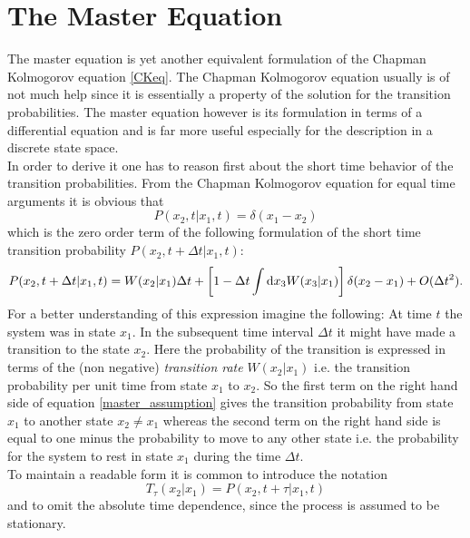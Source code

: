 \section{The Master Equation}
\label{The_Master_Equation}
The master equation is yet another equivalent formulation of the Chapman Kolmogorov equation \eqref{CKeq}. The Chapman Kolmogorov equation usually is of not much help since it is essentially a property of the solution for the transition probabilities. The master equation however is its formulation in terms of a differential equation and is far more useful especially for the description in a discrete state space. \\
In order to derive it one has to reason first about the short time behavior of the transition probabilities. From the Chapman Kolmogorov equation for equal time arguments it is obvious that
\begin{equation}
    P(x_2,t|x_1,t) = \delta(x_1-x_2)
    \label{leading_order}
\end{equation}
which is the zero order term of the following formulation of the short time transition probability $P(x_2,t+\Delta t|x_1,t)$:
\begin{equation}
    P(x_2,t+\Delta t|x_1,t) = W(x_2|x_1)\Delta t + \left[ 1 - \Delta t \int {\rm d} x_3 W(x_3|x_1) \right] \delta(x_2-x_1) + O(\Delta t ^{2}).
    \label{master_assumption}
\end{equation}
For a better understanding of this expression imagine the following: At time $t$ the system was in state $x_1$. In the subsequent time interval $\Delta t$ it might have made a transition to the state $x_2$.
Here the probability of the transition is expressed in terms of the (non negative) {\it transition rate}  $W(x_2|x_1)$ i.e. the transition probability per unit time from state $x_1$ to $x_2$. So the first term on the right hand side of equation \eqref{master_assumption} gives the transition probability from state $x_1$ to another state $x_2 \ne x_1$ whereas the second term on the right hand side is equal to one minus the probability to move to any other state i.e. the probability for the system to rest in state $x_1$ during the time $\Delta t$.\\
To maintain a readable form it is common to introduce the notation
\begin{equation}
    T_\tau (x_2|x_1) = P(x_2,t+\tau|x_1,t)
\end{equation}
and to omit the absolute time dependence, since the process is assumed to be stationary. \\

